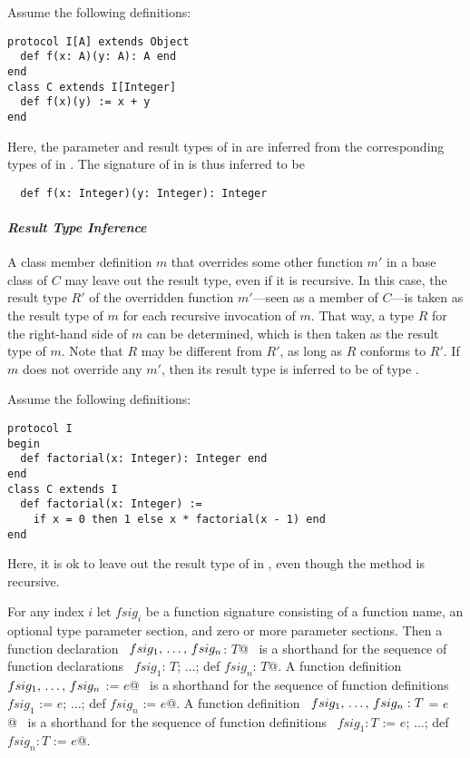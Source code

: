 \example Assume the following definitions:
\begin{lstlisting}
protocol I[A] extends Object
  def f(x: A)(y: A): A end
end
class C extends I[Integer]
  def f(x)(y) := x + y
end
\end{lstlisting}
Here, the parameter and result types of \lstinline@f@ in \lstinline@C@ are inferred from the corresponding types of \lstinline@f@ in \lstinline@I@. The signature of \lstinline@f@ in \lstinline@C@ is thus inferred to be
\begin{lstlisting}
  def f(x: Integer)(y: Integer): Integer
\end{lstlisting}

\paragraph{\em Result Type Inference}
A class member definition $m$ that overrides some other function $m'$ in a base class of $C$ may leave out the result type, even if it is recursive. In this case, the result type $R'$ of the overridden function $m'$---seen as a member of $C$---is taken as the result type of $m$ for each recursive invocation of $m$. That way, a type $R$ for the right-hand side of $m$ can be determined, which is then taken as the result type of $m$. Note that $R$ may be different from $R'$, as long as $R$ conforms to $R'$. If $m$ does not override any $m'$, then its result type is inferred to be of type . 

\example Assume the following definitions:
\begin{lstlisting}
protocol I
begin
  def factorial(x: Integer): Integer end
end
class C extends I
  def factorial(x: Integer) :=
    if x = 0 then 1 else x * factorial(x - 1) end
end
\end{lstlisting}
Here, it is ok to leave out the result type of \lstinline@factorial@
in \lstinline@C@, even though the method is recursive. 

For any index $i$ let $fsig_i$ be a function signature consisting of a function
name, an optional type parameter section, and zero or more parameter
sections. Then a function declaration 
~\lstinline@def $fsig_1 ,\, \ldots ,\, fsig_n$: $T$@~ 
is a shorthand for the sequence of function
declarations ~\lstinline@def $fsig_1$: $T$; $\ldots$; def $fsig_n$: $T$@.  
A function definition ~\lstinline@def $fsig_1 ,\, \ldots ,\, fsig_n$ := $e$@~ is a
shorthand for the sequence of function definitions 
~\lstinline@def $fsig_1$ := $e$; $\ldots$; def $fsig_n$ := $e$@.  
A function definition
~\lstinline@def $fsig_1 ,\, \ldots ,\, fsig_n: T$ = $e$@~ is a shorthand for the
sequence of function definitions 
~\lstinline@def $fsig_1: T$ := $e$; $\ldots$; def $fsig_n: T$ := $e$@.






